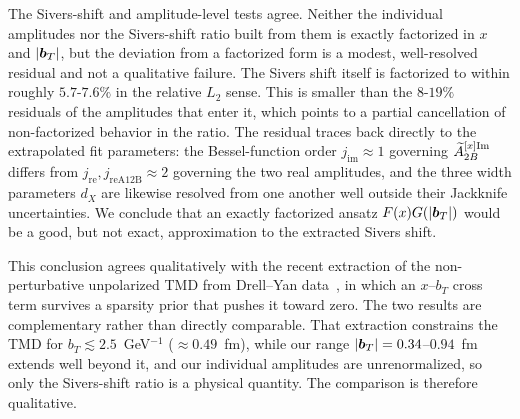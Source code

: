 The Sivers-shift and amplitude-level tests agree. Neither the individual amplitudes nor the Sivers-shift ratio built from them is exactly factorized in $x$ and $|\boldsymbol{b}_T|$, but the deviation from a factorized form is a modest, well-resolved residual and not a qualitative failure. The Sivers shift itself is factorized to within roughly $5.7$-$7.6\%$ in the relative $L_2$ sense. This is smaller than the $8$-$19\%$ residuals of the amplitudes that enter it, which points to a partial cancellation of non-factorized behavior in the ratio. The residual traces back directly to the extrapolated fit parameters: the Bessel-function order $j_{\text{im}}\approx1$ governing $\widetilde{A}^{[x]\text{Im}}_{2B}$ differs from $j_{\text{re}},j_{\text{reA12B}}\approx2$ governing the two real amplitudes, and the three width parameters $d_X$ are likewise resolved from one another well outside their Jackknife uncertainties. We conclude that an exactly factorized ansatz $F(x)G(|\boldsymbol{b}_T|)$ would be a good, but not exact, approximation to the extracted Sivers shift.

This conclusion agrees qualitatively with the recent extraction of the non-perturbative unpolarized TMD from Drell--Yan data~\cite{Granger:2026symb}, in which an $x$--$b_T$ cross term survives a sparsity prior that pushes it toward zero. The two results are complementary rather than directly comparable. That extraction constrains the TMD for $b_T \lesssim 2.5$~GeV$^{-1}$ ($\approx 0.49$~fm), while our range $|\boldsymbol{b}_T| = 0.34$--$0.94$~fm extends well beyond it, and our individual amplitudes are unrenormalized, so only the Sivers-shift ratio is a physical quantity. The comparison is therefore qualitative.

\pagebreak
